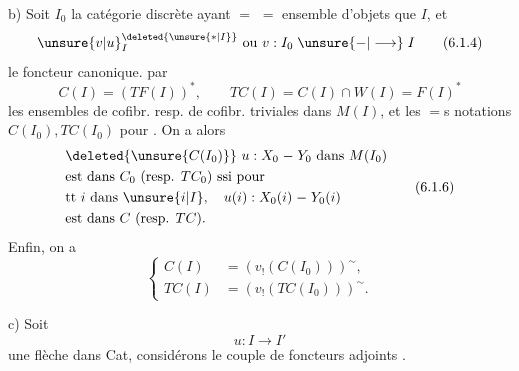 
b) Soit $I_{0}$ la catégorie discrète ayant $=$
$=$ ensemble d'objets que $I$, et
\[
 \unsure{v|u}_{I}^{\deleted{\unsure{*|I}}}\ \text{ou }v:I_{0}\mathrel{\unsure{-|\longrightarrow}}I\tag*{(6.1.4)}
\]
le foncteur canonique.  par
\[
 C(I)=(TF(I))^{*},\qquad TC(I)=C(I)\cap W(I)=F(I)^{*}\tag*{(6.1.5)}
\]
les ensembles de cofibr. resp. de cofibr.
triviales dans $M(I)$, et  les
$=$s notations $C(I_{0}),TC(I_{0})$ pour . On
a alors
\[
\begin{aligned}
 &\deleted{\unsure{C(I_{0})}}\ u:X_{0}\mathrel{-}Y_{0}\ \text{dans }M(I_{0})\\
 &\text{est dans } C_{0}\ \text{(resp. }TC_{0})\ \text{ssi pour}\\
 &\text{tt }i\ \text{dans }\unsure{i|I},\quad u(i):X_{0}(i)\mathrel{-}Y_{0}(i)\\
 &\text{est dans }C\ \text{(resp. }TC).
\end{aligned}\tag*{(6.1.6)}
\]
Enfin, on a
\[
\left\{\begin{aligned}
 C(I)&=(v_{!}(C(I_{0})))^{\sim},\\
 TC(I)&=(v_{!}(TC(I_{0})))^{\sim}.
\end{aligned}\right.\tag*{(6.1.7.)}
\]

c) Soit 
\[
 u:I\longrightarrow I'
\]
une flèche  dans Cat, considérons
le couple de foncteurs adjoints
.

